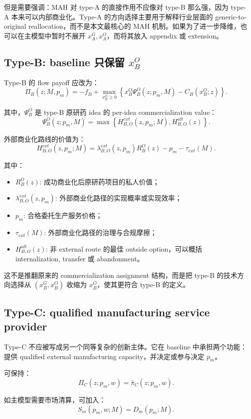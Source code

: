 \documentclass[12pt]{article}
\begin{document}
但是需要强调：MAH 对 type-A 的直接作用不应像对 type-B 那么强，因为 type-A 本来可以内部商业化。Type-A 的方向选择主要用于解释行业层面的 generic-to-original reallocation，而不是本文最核心的 MAH 机制。如果为了进一步降维，也可以在主模型中暂时不展开 $x_A^G,x_A^O$，而将其放入 appendix 或 extension。

\subsection{Type-B: baseline 只保留 $x_B^O$}

Type-B 的 flow payoff 应改为：
\[
\Pi_B(z;M,p_m)
=
-f_B
+
\max_{x_B^O\ge 0}
\left\{
x_B^O\Psi_B^O(z;p_m,M)
-
C_B(x_B^O;z)
\right\}.
\]

其中，$\Psi_B^O$ 是 type-B 原研药 idea 的 per-idea commercialization value：
\[
\Psi_B^O(z;p_m,M)
=
\max
\left\{
H_{B,O}^{ext}(z,p_m;M),
H_{B,O}^{alt}(z)
\right\}.
\]

外部商业化路线的价值为：
\[
H_{B,O}^{ext}(z,p_m;M)
=
\lambda_{B,O}^{ext}(z,p_m)R_B^O(z)
-
p_m
-
\tau_{ext}(M).
\]

其中：
\begin{itemize}
    \item $R_B^O(z)$: 成功商业化后原研药项目的私人价值；
    \item $\lambda_{B,O}^{ext}(z,p_m)$: 外部商业化路径的实现概率或实现效率；
    \item $p_m$: 合格委托生产服务价格；
    \item $\tau_{ext}(M)$: 外部商业化路径的治理与合规摩擦；
    \item $H_{B,O}^{alt}(z)$: 非 external route 的最佳 outside option，可以概括 internalization, transfer 或 abandonment。
\end{itemize}

这不是推翻原来的 commercialization assignment 结构，而是把 type-B 的技术方向选择从 $(x_B^G,x_B^O)$ 收缩为 $x_B^O$，使其更符合 type-B 的定义。

\subsection{Type-C: qualified manufacturing service provider}

Type-C 不应被写成另一个同等复杂的创新主体。它在 baseline 中承担两个功能：提供 qualified external manufacturing capacity，并决定或参与决定 $p_m$。

可保持：
\[
\Pi_C(z;p_m,w)
=
\bar{\pi}_C(z;p_m,w).
\]

如主模型需要市场清算，可加入：
\[
S_m(p_m,w;M)=D_m(p_m;M).
\]
\end{document}
